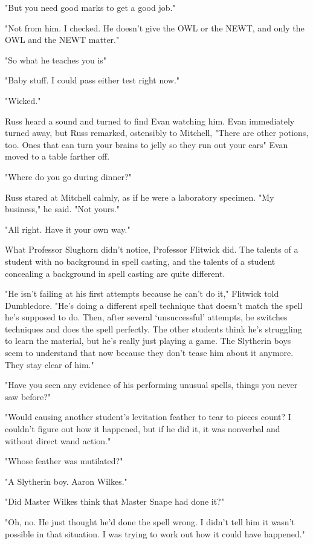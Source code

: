 "But you need good marks to get a good job."

"Not from him. I checked. He doesn't{\el} give the OWL or the NEWT, and only the{\el} OWL and the NEWT matter."

"So what he teaches you is{\el}"

"Baby stuff. I could pass either{\el} test right now."

"Wicked."

Russ heard a sound and turned to find Evan watching him. Evan immediately turned away, but Russ remarked, ostensibly to Mitchell, "There are other{\el} potions, too. Ones that can turn your{\el} brains to jelly so they run{\el} out your ears{\el}" Evan moved to a table farther off.

"Where do you go during dinner?"

Russ stared at Mitchell calmly, as if he were a laboratory specimen. "My{\el} business," he said. "Not yours."

"All right. Have it your own way."

What Professor Slughorn didn't notice, Professor Flitwick did. The talents of a student with no background in spell casting, and the talents of a student concealing a background in spell casting are quite different.

"He isn't failing at his first attempts because he can't do it," Flitwick told Dumbledore. "He's doing a different spell technique that doesn't match the spell he's supposed to do. Then, after several `unsuccessful' attempts, he switches techniques and does the spell perfectly. The other students think he's struggling to learn the material, but he's really just playing a game. The Slytherin boys seem to understand that now because they don't tease him about it anymore. They stay clear of him."

"Have you seen any evidence of his performing unusual spells, things you never saw before?"

"Would causing another student's levitation feather to tear to pieces count? I couldn't figure out how it happened, but if he did it, it was nonverbal and without direct wand action."

"Whose feather was mutilated?"

"A Slytherin boy. Aaron Wilkes."

"Did Master Wilkes think that Master Snape had done it?"

"Oh, no. He just thought he'd done the spell wrong. I didn't tell him it wasn't possible in that situation. I was trying to work out how it could have happened."

